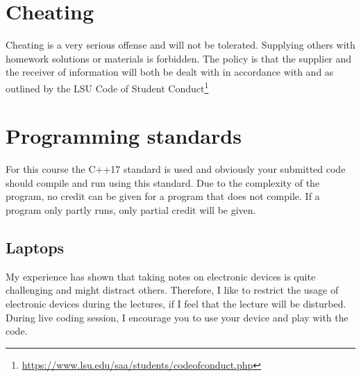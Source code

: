 \documentclass[11pt,letterpaper]{article}
\begin{document}
\section{Cheating}
Cheating is a very serious offense and will not be tolerated. Supplying others with homework solutions or materials is forbidden. The  policy  is  that  the supplier and the receiver of information will both be dealt with in accordance with and as outlined by the LSU Code of Student Conduct\footnote{\url{https://www.lsu.edu/saa/students/codeofconduct.php}}

\section*{Programming standards}
For this course the C++17 standard is used and obviously your submitted code should compile and run using this standard. Due to the complexity of the program, no credit can be given for a program that does not compile. If a program only partly runs, only partial credit will be given.

\subsection*{Laptops}
My experience has shown that taking notes on electronic devices is quite challenging and might distract others. Therefore, I like to restrict the usage of electronic devices during the lectures, if I feel that the lecture will be disturbed. During live coding session, I encourage you to use your device and play with the code.
\end{document}
